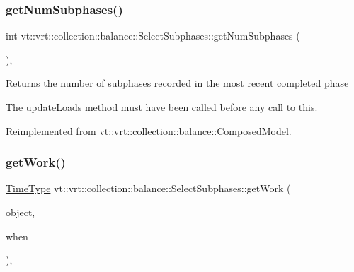 \subsubsection{\texorpdfstring{get\+Num\+Subphases()}{getNumSubphases()}}
{\footnotesize\ttfamily int vt\+::vrt\+::collection\+::balance\+::\+Select\+Subphases\+::get\+Num\+Subphases (\begin{DoxyParamCaption}{ }\end{DoxyParamCaption})\hspace{0.3cm}{\ttfamily [override]}, {\ttfamily [virtual]}}

Returns the number of subphases recorded in the most recent completed phase

The {\ttfamily update\+Loads} method must have been called before any call to this. 

Reimplemented from \hyperlink{classvt_1_1vrt_1_1collection_1_1balance_1_1_composed_model_af3ea09828c281d9c278198a19fe4e533}{vt\+::vrt\+::collection\+::balance\+::\+Composed\+Model}.

\mbox{\label{classvt_1_1vrt_1_1collection_1_1balance_1_1_select_subphases_a77cf76f7699c9480483cb4104bf58965}} 
\subsubsection{\texorpdfstring{get\+Work()}{getWork()}}
{\footnotesize\ttfamily \hyperlink{namespacevt_a876a9d0cd5a952859c72de8a46881442}{Time\+Type} vt\+::vrt\+::collection\+::balance\+::\+Select\+Subphases\+::get\+Work (\begin{DoxyParamCaption}\item[{\hyperlink{namespacevt_1_1vrt_1_1collection_1_1balance_a9f5b53fafb270212279a4757d2c4cd28}{Element\+I\+D\+Struct}}]{object,  }\item[{\hyperlink{structvt_1_1vrt_1_1collection_1_1balance_1_1_phase_offset}{Phase\+Offset}}]{when }\end{DoxyParamCaption})\hspace{0.3cm}{\ttfamily [override]}, {\ttfamily [virtual]}}



